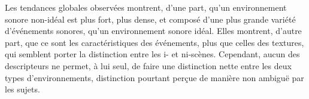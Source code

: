 Les tendances globales observées montrent, d'une part, qu'un environnement sonore non-idéal est plus fort, plus dense, et composé d'une plus grande variété d'événements sonores, qu'un environnement sonore idéal. Elles montrent, d'autre part, que ce sont les caractéristiques des événements, plus que celles des textures, qui semblent porter la distinction entre les i- et ni-scènes. Cependant, aucun des descripteurs ne permet, à lui seul, de faire une distinction nette entre les deux types d'environnements, distinction pourtant perçue de manière non ambiguë par les sujets.

\begin{figure}[t]
        \myfloatalign
        \par

\end{figure}
